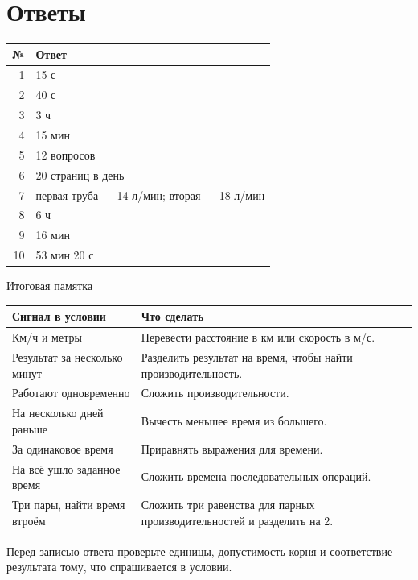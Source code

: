 \documentclass[a4paper,12pt]{article}
\begin{document}
\section*{Ответы}
\begin{center}
\begin{tabularx}{.88\linewidth}{@{}rX@{}}
\toprule
№ & Ответ\\\midrule
1 & 15 с\\
2 & 40 с\\
3 & 3 ч\\
4 & 15 мин\\
5 & 12 вопросов\\
6 & 20 страниц в день\\
7 & первая труба --- 14 л/мин; вторая --- 18 л/мин\\
8 & 6 ч\\
9 & 16 мин\\
10 & 53 мин 20 с\\\bottomrule
\end{tabularx}
\end{center}
\vspace{6mm}
\begin{center}{\large\color{darkaccent} Итоговая памятка}\end{center}
\begin{tabularx}{\linewidth}{@{}p{.37\linewidth}X@{}}
\toprule
Сигнал в условии & Что сделать\\\midrule
Км/ч и метры & Перевести расстояние в км или скорость в м/с.\\
Результат за несколько минут & Разделить результат на время, чтобы найти производительность.\\
Работают одновременно & Сложить производительности.\\
На несколько дней раньше & Вычесть меньшее время из большего.\\
За одинаковое время & Приравнять выражения для времени.\\
На всё ушло заданное время & Сложить времена последовательных операций.\\
Три пары, найти время втроём & Сложить три равенства для парных производительностей и разделить на 2.\\\bottomrule
\end{tabularx}
\medskip
Перед записью ответа проверьте единицы, допустимость корня и соответствие результата тому, что спрашивается в условии.
\end{document}
